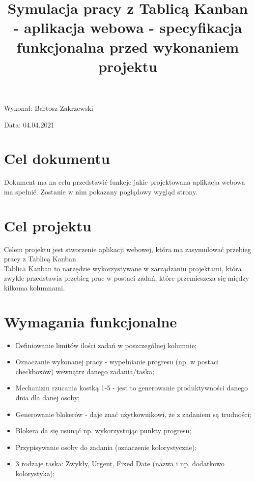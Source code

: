 \documentclass{article}
\title{Symulacja pracy z Tablicą Kanban - aplikacja webowa - specyfikacja funkcjonalna
przed wykonaniem projektu}
\author{}
\date{}
\begin{document}
\maketitle

\begin{flushright}
\par
\vfill
\par
Wykonał: Bartosz Zakrzewski

Data: 04.04.2021

\end{flushright}
\thispagestyle{empty}


\tableofcontents


\section{Cel dokumentu}
Dokument ma na celu przedstawić funkcje jakie projektowana aplikacja webowa ma spełnić. 
Zostanie w nim pokazany poglądowy wygląd strony.

\section{Cel projektu}
Celem projektu jest stworzenie aplikacji webowej, która ma zasymulować przebieg pracy z Tablicą Kanban. \\
Tablica Kanban to narzędzie wykorzystywane w zarządzaniu projektami, która zwykle przedstawia przebieg prac w postaci zadań, które przemieszcza się między kilkoma kolumnami.

\section{Wymagania funkcjonalne}
\begin{itemize}
    \item Definiowanie limitów ilości zadań w poszczególnej kolumnie;
    \item Oznaczanie wykonanej pracy - wypełnianie progresu (np. w postaci checkboxów) wewnątrz danego zadania/taska;
    \item Mechanizm rzucania kostką 1-5 - jest to generowanie produktywności danego dnia dla danej osoby;
    \item Generowanie blokerów - daje znać użytkownikowi, że z zadaniem są trudności; 
    \item Blokera da się usunąć np. wykorzystując punkty progresu;
    \item Przypisywanie osoby do zadania (oznaczenie kolorystyczne);
    \item 3 rodzaje taska: Zwykły, Urgent, Fixed Date (nazwa i np. dodatkowo kolorystyka);
\end{itemize}
\end{document}
